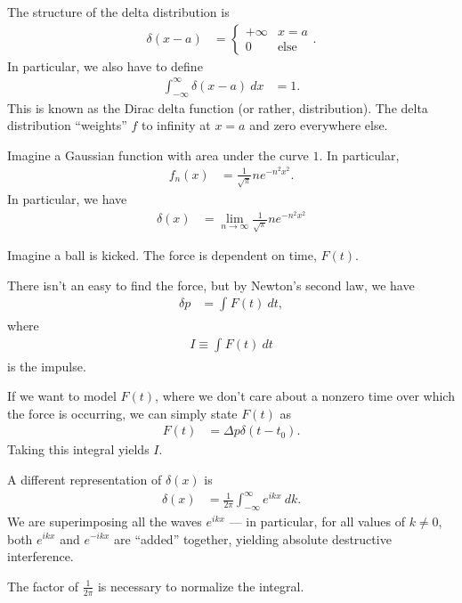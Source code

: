 \documentclass[10pt]{mypackage}
\begin{document}
The structure of the delta distribution is
\begin{align*}
  \delta\left(x-a\right) &= \begin{cases}
    +\infty & x=a\\
    0 & \text{else}
  \end{cases}.
\end{align*}
In particular, we also have to define
\begin{align*}
  \int_{-\infty}^{\infty} \delta\left(x-a\right)\:dx &= 1.
\end{align*}
This is known as the Dirac delta function (or rather, distribution). The delta distribution ``weights'' $f$ to infinity at $x=a$ and zero everywhere else.
\begin{example}
  Imagine a Gaussian function with area under the curve $1$. In particular,
  \begin{align*}
    f_n(x) &= \frac{1}{\sqrt{\pi}}ne^{-n^2x^2}.
  \end{align*}
  In particular, we have
  \begin{align*}
    \delta(x) &= \lim_{n\rightarrow\infty}\frac{1}{\sqrt{\pi}}ne^{-n^2x^2}
  \end{align*}
\end{example}
\begin{example}
  Imagine a ball is kicked. The force is dependent on time, $F(t)$.\newline

  There isn't an easy to find the force, but by Newton's second law, we have
  \begin{align*}
    \delta p &= \int_{}^{} F(t)\:dt,
  \end{align*}
  where
  \begin{align*}
    I \equiv \int_{}^{} F(t)\:dt
  \end{align*}
  is the impulse.\newline

  If we want to model $F(t)$, where we don't care about a nonzero time over which the force is occurring, we can simply state $F(t)$ as
  \begin{align*}
    F(t) &= \Delta p \delta\left(t-t_0\right).
  \end{align*}
  Taking this integral yields $I$.
\end{example}
\begin{example}
A different representation of $\delta(x)$ is
\begin{align*}
  \delta(x) &= \frac{1}{2\pi}\int_{-\infty}^{\infty} e^{ikx}\:dk.
\end{align*}
We are superimposing all the waves $e^{ikx}$ --- in particular, for all values of $k\neq 0$, both $e^{ikx}$ and $e^{-ikx}$ are ``added'' together, yielding absolute destructive interference.\newline

The factor of $\frac{1}{2\pi}$ is necessary to normalize the integral.
\end{example}
\end{document}
